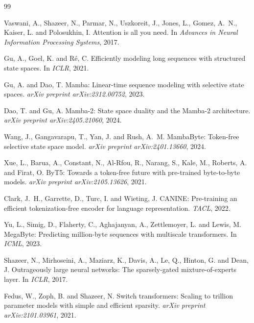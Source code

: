 \documentclass[11pt]{article}
\begin{document}
\begin{thebibliography}{99}

Vaswani, A., Shazeer, N., Parmar, N., Uszkoreit, J., Jones, L., Gomez, A.~N.,
Kaiser, {L}. and Polosukhin, I.
\newblock Attention is all you need.
\newblock In \emph{Advances in Neural Information Processing Systems}, 2017.

Gu, A., Goel, K. and R\'e, C.
\newblock Efficiently modeling long sequences with structured state spaces.
\newblock In \emph{ICLR}, 2021.

Gu, A. and Dao, T.
\newblock Mamba: Linear-time sequence modeling with selective state spaces.
\newblock \emph{arXiv preprint arXiv:2312.00752}, 2023.

Dao, T. and Gu, A.
\newblock Mamba-2: State space duality and the Mamba-2 architecture.
\newblock \emph{arXiv preprint arXiv:2405.21060}, 2024.

Wang, J., Gangavarapu, T., Yan, J. and Rush, A.~M.
\newblock MambaByte: Token-free selective state space model.
\newblock \emph{arXiv preprint arXiv:2401.13660}, 2024.

Xue, L., Barua, A., Constant, N., Al-Rfou, R., Narang, S., Kale, M.,
Roberts, A. and Firat, O.
\newblock ByT5: Towards a token-free future with pre-trained byte-to-byte models.
\newblock \emph{arXiv preprint arXiv:2105.13626}, 2021.

Clark, J.~H., Garrette, D., Turc, I. and Wieting, J.
\newblock CANINE: Pre-training an efficient tokenization-free encoder for
language representation.
\newblock \emph{TACL}, 2022.

Yu, L., Simig, D., Flaherty, C., Aghajanyan, A., Zettlemoyer, L. and Lewis, M.
\newblock MegaByte: Predicting million-byte sequences with multiscale transformers.
\newblock In \emph{ICML}, 2023.

Shazeer, N., Mirhoseini, A., Maziarz, K., Davis, A., Le, Q., Hinton, G. and
Dean, J.
\newblock Outrageously large neural networks: The sparsely-gated
mixture-of-experts layer.
\newblock In \emph{ICLR}, 2017.

Fedus, W., Zoph, B. and Shazeer, N.
\newblock Switch transformers: Scaling to trillion parameter models with simple
and efficient sparsity.
\newblock \emph{arXiv preprint arXiv:2101.03961}, 2021.


\end{thebibliography}
\end{document}
